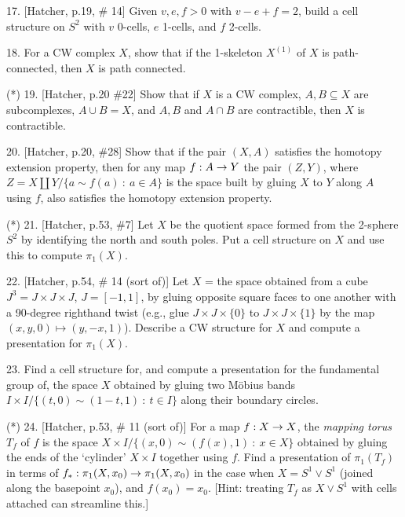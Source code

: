 \documentclass[12pt]{article}
\begin{document}
\begin{description}


\item{17.} [Hatcher, p.19, \# 14] Given $v,e,f>0$ with $v-e+f=2$, build a cell structure on $S^2$ with
$v$ 0-cells, $e$ 1-cells, and $f$ 2-cells. 

\msk

\item{18.} For a CW complex $X$, show that if the 1-skeleton $X^{(1)}$ of $X$ is path-connected, then 
$X$ is path connected.

\msk

\item{(*)} 19. [Hatcher, p.20 \#22] Show that if $X$ is a CW complex, $A,B\subseteq X$ are subcomplexes, 
$A\cup B=X$, and $A,B$ and $A\cap B$ are contractible, then $X$ is contractible.

\msk

\item{20.} [Hatcher, p.20, \#28] Show that if the pair $(X,A)$ satisfies the 
homotopy extension property, then for any map $f:A\rightarrow Y$ the pair
$(Z,Y)$, where $Z=X\coprod Y/\{a\sim f(a)\ :\ a\in A\}$ is the space built 
by gluing $X$ to $Y$ along $A$ using $f$, also satisfies the 
homotopy extension property.

\msk

\item{(*)} 21. [Hatcher, p.53, \#7] Let $X$ be the quotient space formed from the 2-sphere
$S^2$ by identifying the north and south poles. Put a cell structure on
$X$ and use this to compute $\pi_1(X)$.

\msk

\item{22.} [Hatcher, p.54, \# 14 (sort of)] 
Let $X$ = the space obtained from a cube $J^3=J\times J\times J$,
$J=[-1,1]$,
by gluing opposite square faces to one another with a 90-degree righthand
twist (e.g., glue $J\times J\times \{0\}$ to $J\times J\times \{1\}$ by the
map
$(x,y,0)\mapsto (y,-x,1)$). Describe a CW structure for $X$ and compute a presentation for $\pi_1(X)$. 

\msk

\item{23.} Find a cell structure for, and compute a presentation for the fundamental group of,
the space $X$ obtained by gluing two M\"obius bands 
$I\times I/\{(t,0)\sim(1-t,1)\ :\ t\in I\}$ along their boundary circles.

\msk

\item{(*)} 24. [Hatcher, p.53, \# 11 (sort of)] For a map $f:X\rightarrow X$, the {\it mapping torus}
$T_f$ of $f$ is the space $X\times I/\{(x,0)\sim (f(x),1)\ :\ x\in X\}$ obtained by
gluing the ends of the `cylinder' $X\times I$ together using $f$. Find a presentation of
$\pi_1(T_f)$ in terms of $f_*:\pi_1(X,x_0)\rightarrow \pi_1(X,x_0)$ in the case when 
$X=S^1\vee S^1$ (joined along the basepoint $x_0$), and $f(x_0)=x_0$. [Hint: treating $T_f$
as $X\vee S^1$ with cells attached can streamline this.] 


\end{description}
\vfill
\end{document}
